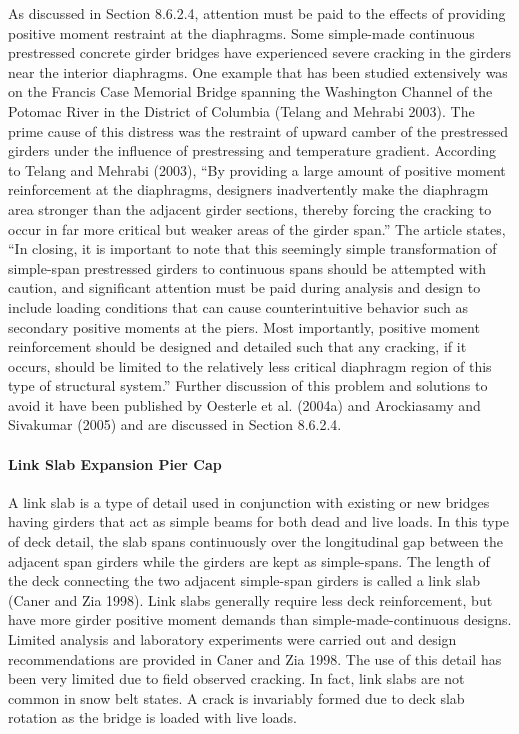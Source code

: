 As discussed in Section 8.6.2.4, attention must be paid to the effects of providing positive moment restraint at the
diaphragms. Some simple-made continuous prestressed concrete girder bridges have experienced severe cracking in
the girders near the interior diaphragms. One example that has been studied extensively was on the Francis Case
Memorial Bridge spanning the Washington Channel of the Potomac River in the District of Columbia (Telang and
Mehrabi 2003). The prime cause of this distress was the restraint of upward camber of the prestressed girders under
the influence of prestressing and temperature gradient. According to Telang and Mehrabi (2003), “By providing a
large amount of positive moment reinforcement at the diaphragms, designers inadvertently make the diaphragm area
stronger than the adjacent girder sections, thereby forcing the cracking to occur in far more critical but weaker areas
of the girder span.” The article states, “In closing, it is important to note that this seemingly simple transformation of
simple-span prestressed girders to continuous spans should be attempted with caution, and significant attention must
be paid during analysis and design to include loading conditions that can cause counterintuitive behavior such as
secondary positive moments at the piers. Most importantly, positive moment reinforcement should be designed and
detailed such that any cracking, if it occurs, should be limited to the relatively less critical diaphragm region of this
type of structural system.” Further discussion of this problem and solutions to avoid it have been published by
Oesterle et al. (2004a) and Arockiasamy and Sivakumar (2005) and are discussed in Section 8.6.2.4.

\paragraph{Link Slab Expansion Pier Cap}
A link slab is a type of detail used in conjunction with existing or new bridges having girders that act as simple
beams for both dead and live loads. In this type of deck detail, the slab spans continuously over the longitudinal gap
between the adjacent span girders while the girders are kept as simple-spans. The length of the deck connecting the
two adjacent simple-span girders is called a link slab (Caner and Zia 1998). Link slabs generally require less deck reinforcement, but have more girder positive moment demands than simple-made-continuous designs. Limited
analysis and laboratory experiments were carried out and design recommendations are provided in Caner and Zia
1998. The use of this detail has been very limited due to field observed cracking. In fact, link slabs are not common in
snow belt states. A crack is invariably formed due to deck slab rotation as the bridge is loaded with live loads.

